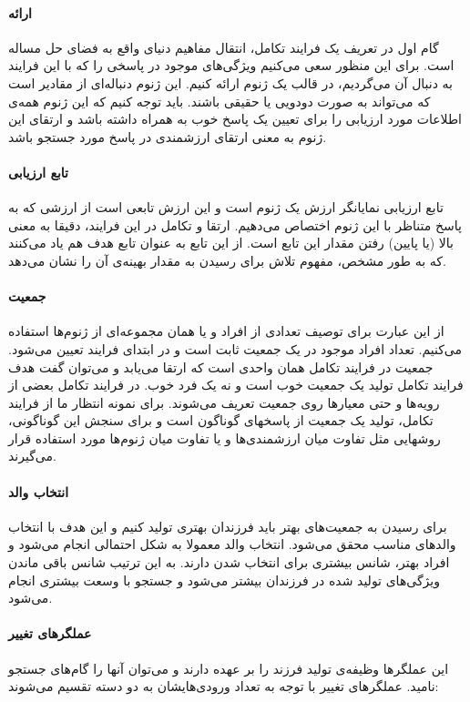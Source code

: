 \documentclass{report}
\begin{document}
\paragraph{ارائه}
گام اول در تعریف یک فرایند تکامل، انتقال مفاهیم دنیای واقع به فضای حل مساله است. برای این منظور سعی می‌کنیم ویژگی‌های موجود در پاسخی را که با این فرایند به دنبال آن می‌گردیم، در قالب یک ژنوم ارائه کنیم. این ژنوم دنباله‌ای از مقادیر است که می‌تواند به صورت دودویی یا حقیقی باشند. باید توجه کنیم که این ژنوم همه‌ی اطلاعات مورد ارزیابی را برای تعیین یک پاسخ خوب به همراه داشته باشد و ارتقای این ژنوم به معنی ارتقای ارزشمندی در پاسخ مورد جستجو باشد.

\paragraph{تابع ارزیابی}
تابع ارزیابی نمایانگر ارزش یک ژنوم است و این ارزش تابعی است از ارزشی که به پاسخ متناظر با این ژنوم اختصاص می‌دهیم. ارتقا و تکامل در این فرایند، دقیقا به معنی بالا (یا پایین) رفتن مقدار این تابع است. از این تابع به عنوان تابع هدف هم یاد می‌کنند که به طور مشخص، مفهوم تلاش برای رسیدن به مقدار بهینه‌ی آن را نشان می‌دهد.

\paragraph{جمعیت}
از این عبارت برای توصیف تعدادی از افراد و یا همان مجموعه‌ای از ژنوم‌ها استفاده می‌کنیم. تعداد افراد موجود در یک جمعیت ثابت است و در ابتدای فرایند تعیین می‌شود. جمعیت در فرایند تکامل همان واحدی است که ارتقا می‌یابد و می‌توان گفت هدف فرایند تکامل تولید یک جمعیت خوب است و نه یک فرد خوب. در فرایند تکامل بعضی از رویه‌ها و حتی معیارها روی جمعیت تعریف می‌شوند. برای نمونه انتظار ما از فرایند تکامل، تولید یک جمعیت از پاسخهای گوناگون است و برای سنجش این گوناگونی، روشهایی مثل تفاوت میان ارزشمندی‌ها و یا تفاوت میان ژنوم‌ها مورد استفاده قرار می‌گیرند.

\paragraph{انتخاب والد}
برای رسیدن به جمعیت‌های بهتر باید فرزندان بهتری تولید کنیم و این هدف با انتخاب والدهای مناسب محقق می‌شود. انتخاب والد معمولا به شکل احتمالی انجام می‌شود و افراد بهتر، شانس بیشتری برای انتخاب شدن دارند. به این ترتیب شانس باقی ماندن ویژگی‌های تولید شده در فرزندان بیشتر می‌شود و جستجو با وسعت بیشتری انجام می‌شود.

\paragraph{عملگرهای تغییر}
این عملگرها وظیفه‌ی تولید فرزند را بر عهده دارند و می‌توان آنها را گام‌های جستجو نامید. عملگرهای تغییر با توجه به تعداد ورودی‌هایشان به دو دسته تقسیم می‌شوند:
\end{document}
